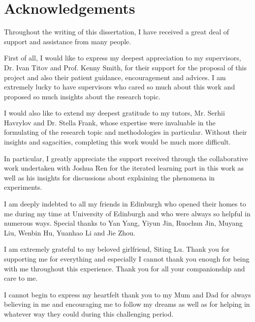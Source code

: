 \section*{Acknowledgements}
Throughout the writing of this dissertation, I have received a great deal of support and assistance from many people. 

First of all, I would like to express my deepest appreciation to my supervisors, Dr. Ivan Titov and Prof. Kenny Smith, for their support for the proposal of this project and also their patient guidance, encouragement and advices. I am extremely lucky to have supervisors who cared so much about this work and proposed so much insights about the research topic.

I would also like to extend my deepest gratitude to my tutors, Mr. Serhii Havrylov and Dr. Stella Frank, whose expertise were invaluable in the formulating of the research topic and methodologies in particular. Without their insights and sagacities, completing this work would be much more difficult.

In particular, I greatly appreciate the support received through the collaborative work undertaken with Joshua Ren for the iterated learning part in this work as well as his insights for discussions about explaining the phenomena in experiments.

I am deeply indebted to all my friends in Edinburgh who opened their homes to me during my time at University of Edinburgh and who were always so helpful in numerous ways. Special thanks to Yan Yang, Yiyun Jin, Ruochun Jin, Muyang Liu, Wenbin Hu, Yuanhao Li and Jie Zhou.

I am extremely grateful to my beloved girlfriend, Siting Lu. Thank you for supporting me for everything and especially I cannot thank you enough for being with me throughout this experience. Thank you for all your companionship and care to me.

I cannot begin to express my heartfelt thank you to my Mum and Dad for always believing in me and encouraging me to follow my dreams as well as for helping in whatever way they could during this challenging period.